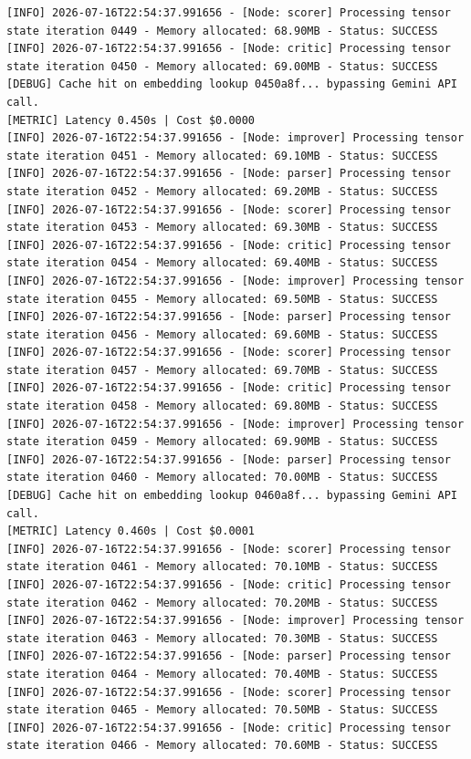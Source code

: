 \documentclass[10pt,journal,compsoc]{IEEEtran}
\begin{document}
\begin{verbatim}
[INFO] 2026-07-16T22:54:37.991656 - [Node: scorer] Processing tensor state iteration 0449 - Memory allocated: 68.90MB - Status: SUCCESS
[INFO] 2026-07-16T22:54:37.991656 - [Node: critic] Processing tensor state iteration 0450 - Memory allocated: 69.00MB - Status: SUCCESS
[DEBUG] Cache hit on embedding lookup 0450a8f... bypassing Gemini API call.
[METRIC] Latency 0.450s | Cost $0.0000
[INFO] 2026-07-16T22:54:37.991656 - [Node: improver] Processing tensor state iteration 0451 - Memory allocated: 69.10MB - Status: SUCCESS
[INFO] 2026-07-16T22:54:37.991656 - [Node: parser] Processing tensor state iteration 0452 - Memory allocated: 69.20MB - Status: SUCCESS
[INFO] 2026-07-16T22:54:37.991656 - [Node: scorer] Processing tensor state iteration 0453 - Memory allocated: 69.30MB - Status: SUCCESS
[INFO] 2026-07-16T22:54:37.991656 - [Node: critic] Processing tensor state iteration 0454 - Memory allocated: 69.40MB - Status: SUCCESS
[INFO] 2026-07-16T22:54:37.991656 - [Node: improver] Processing tensor state iteration 0455 - Memory allocated: 69.50MB - Status: SUCCESS
[INFO] 2026-07-16T22:54:37.991656 - [Node: parser] Processing tensor state iteration 0456 - Memory allocated: 69.60MB - Status: SUCCESS
[INFO] 2026-07-16T22:54:37.991656 - [Node: scorer] Processing tensor state iteration 0457 - Memory allocated: 69.70MB - Status: SUCCESS
[INFO] 2026-07-16T22:54:37.991656 - [Node: critic] Processing tensor state iteration 0458 - Memory allocated: 69.80MB - Status: SUCCESS
[INFO] 2026-07-16T22:54:37.991656 - [Node: improver] Processing tensor state iteration 0459 - Memory allocated: 69.90MB - Status: SUCCESS
[INFO] 2026-07-16T22:54:37.991656 - [Node: parser] Processing tensor state iteration 0460 - Memory allocated: 70.00MB - Status: SUCCESS
[DEBUG] Cache hit on embedding lookup 0460a8f... bypassing Gemini API call.
[METRIC] Latency 0.460s | Cost $0.0001
[INFO] 2026-07-16T22:54:37.991656 - [Node: scorer] Processing tensor state iteration 0461 - Memory allocated: 70.10MB - Status: SUCCESS
[INFO] 2026-07-16T22:54:37.991656 - [Node: critic] Processing tensor state iteration 0462 - Memory allocated: 70.20MB - Status: SUCCESS
[INFO] 2026-07-16T22:54:37.991656 - [Node: improver] Processing tensor state iteration 0463 - Memory allocated: 70.30MB - Status: SUCCESS
[INFO] 2026-07-16T22:54:37.991656 - [Node: parser] Processing tensor state iteration 0464 - Memory allocated: 70.40MB - Status: SUCCESS
[INFO] 2026-07-16T22:54:37.991656 - [Node: scorer] Processing tensor state iteration 0465 - Memory allocated: 70.50MB - Status: SUCCESS
[INFO] 2026-07-16T22:54:37.991656 - [Node: critic] Processing tensor state iteration 0466 - Memory allocated: 70.60MB - Status: SUCCESS

\end{verbatim}
\end{document}

